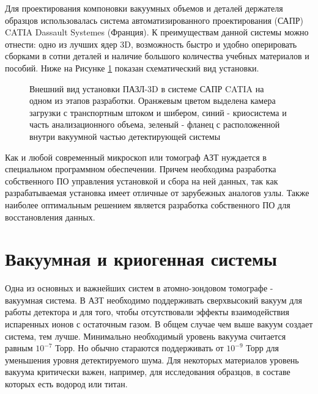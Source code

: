 Для проектирования компоновки вакуумных объемов и деталей держателя образцов использовалась система автоматизированного проектирования (САПР) CATIA Dassault Systemes (Франция). К преимуществам данной системы можно отнести: одно из лучших ядер 3D, возможность быстро и удобно оперировать сборками в сотни деталей и наличие большого количества учебных материалов и пособий. Ниже на Рисунке \cref{fig:APPLE_CAD} показан схематический вид установки.
\begin{figure}[htb]
	\caption{Внешний вид установки ПАЗЛ-3D в системе САПР CATIA на одном из этапов разработки. Оранжевым цветом выделена камера загрузки с транспортным штоком и шибером, синий - криосистема и часть анализационного объема, зеленый - фланец с расположенной внутри вакуумной частью детектирующей системы}
	\label{fig:APPLE_CAD}
\end{figure}

Как и любой современный микроскоп или томограф АЗТ нуждается в специальном программном обеспечении. Причем необходима разработка собственного ПО управления установкой и сбора на ней данных, так как разрабатываемая установка имеет отличные от зарубежных аналогов узлы. Также наиболее оптимальным решением является разработка собственного ПО для восстановления данных.


\FloatBarrier

\section{Вакуумная и криогенная системы}\label{sec:ch2/sec2}

Одна из основных и важнейших систем в атомно-зондовом томографе - вакуумная система. В АЗТ необходимо поддерживать сверхвысокий вакуум для работы детектора и для того, чтобы отсутствовали эффекты взаимодействия испаренных ионов с остаточным газом. В общем случае чем выше вакуум создает система, тем лучше. Минимально необходимый уровень вакуума считается равным $10^{-7}$ Торр. Но обычно стараются поддерживать от $10^{-9}$ Торр для уменьшения уровня детектируемого шума. Для некоторых материалов уровень вакуума критически важен, например, для исследования образцов, в составе которых есть водород или титан.

